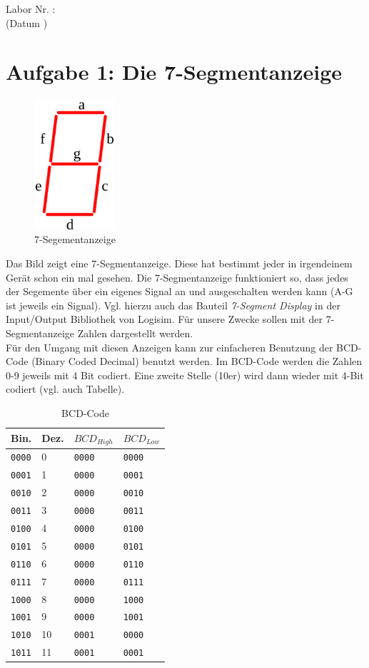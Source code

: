 \documentclass[a4paper]{scrartcl}
\def\header#1#2{
  \begin{center}
    {\Large Labor #1: \TOPIC}\\
    {(Datum #2)}
  \end{center}
}
\begin{document}
\header{Nr. \NUMBER}{\DATE}


\section*{Aufgabe 1: Die 7-Segmentanzeige}
\begin{figure}[h]
  \centering
  \includegraphics[width=3cm]{7segment.png}
  \caption{7-Segementanzeige}
\end{figure}
Das Bild zeigt eine 7-Segmentanzeige. Diese hat bestimmt jeder in irgendeinem Gerät schon ein mal gesehen. Die 7-Segmentanzeige funktioniert so, dass
jedes der Segemente über ein eigenes Signal an und ausgeschalten werden kann (A-G ist jeweils ein Signal). Vgl. hierzu auch das Bauteil \textit{7-Segment Display} in der Input/Output
Bibliothek von Logisim.
Für unsere Zwecke sollen mit der 7-Segmentanzeige Zahlen dargestellt werden.\\

Für den Umgang mit diesen Anzeigen kann zur einfacheren Benutzung der BCD-Code (Binary Coded Decimal) benutzt werden. Im BCD-Code werden die Zahlen 0-9 jeweils mit 4 Bit codiert.
Eine zweite Stelle (10er) wird dann wieder mit 4-Bit codiert (vgl. auch Tabelle).
\begin{table}[h]
  \centering
  \begin{tabular}{l|l|l|l}
    Bin. & Dez. & $BCD_{High}$ & $BCD_{Low}$ \\ \hline
    \texttt{0000} & 0 & \texttt{0000} & \texttt{0000}\\ 
    \texttt{0001} & 1 & \texttt{0000} & \texttt{0001}\\ 
    \texttt{0010} & 2 & \texttt{0000} & \texttt{0010}\\ 
    \texttt{0011} & 3 & \texttt{0000} & \texttt{0011}\\ 
    \texttt{0100} & 4 & \texttt{0000} & \texttt{0100}\\ 
    \texttt{0101} & 5 & \texttt{0000} & \texttt{0101}\\ 
    \texttt{0110} & 6 & \texttt{0000} & \texttt{0110}\\ 
    \texttt{0111} & 7 & \texttt{0000} & \texttt{0111}\\ 
    \texttt{1000} & 8 & \texttt{0000} & \texttt{1000}\\ 
    \texttt{1001} & 9 & \texttt{0000} & \texttt{1001}\\     
    \texttt{1010} & 10 & \texttt{0001} & \texttt{0000}\\     
    \texttt{1011} & 11 & \texttt{0001} & \texttt{0001}\\     
  \end{tabular}
  \caption{BCD-Code}
\end{table}
\end{document}
